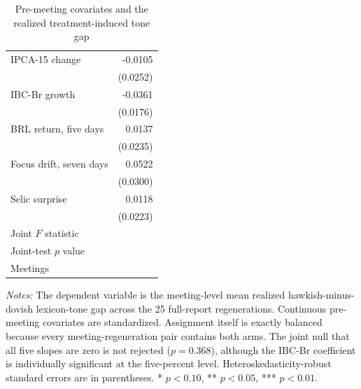 \begin{table}[htbp]
\color{revisionred}
\centering
\begin{threeparttable}
\caption{Pre-meeting covariates and the realized treatment-induced tone gap}
\label{tab:preassignment-orthogonality}
\begin{footnotesize}
\begin{tabular}{ld}
\toprule
 &  \\
\midrule
IPCA-15 change & -0.0105 \\
 & (0.0252) \\
IBC-Br growth & -0.0361\sym{**} \\
 & (0.0176) \\
BRL return, five days & 0.0137 \\
 & (0.0235) \\
Focus drift, seven days & 0.0522\sym{*} \\
 & (0.0300) \\
Selic surprise & 0.0118 \\
 & (0.0223) \\
\midrule
Joint $F$ statistic &  \\
Joint-test $p$ value &  \\
Meetings &  \\
\bottomrule
\end{tabular}
\begin{tablenotes}[flushleft]
\scriptsize
\item \textit{Notes:} The dependent variable is the meeting-level mean realized hawkish-minus-dovish lexicon-tone gap across the 25 full-report regenerations. Continuous pre-meeting covariates are standardized. Assignment itself is exactly balanced because every meeting-regeneration pair contains both arms. The joint null that all five slopes are zero is not rejected ($p=0.368$), although the IBC-Br coefficient is individually significant at the five-percent level. Heteroskedasticity-robust standard errors are in parentheses. * $p<0.10$, ** $p<0.05$, *** $p<0.01$.
\end{tablenotes}
\end{footnotesize}
\end{threeparttable}
\end{table}
